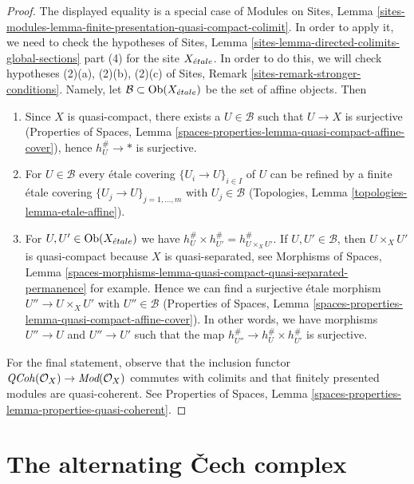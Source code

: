 \begin{proof}
The displayed equality is a special case of Modules on Sites, Lemma
\ref{sites-modules-lemma-finite-presentation-quasi-compact-colimit}.
In order to apply it, we need to check the hypotheses of
Sites, Lemma \ref{sites-lemma-directed-colimits-global-sections} part (4)
for the site $X_{\acute{e}tale}$.
In order to do this, we will check hypotheses
(2)(a), (2)(b), (2)(c) of
Sites, Remark \ref{sites-remark-stronger-conditions}.
Namely, let $\mathcal{B} \subset \mathop{\mathrm{Ob}}\nolimits(X_{\acute{e}tale})$ be the set of affine objects.
Then
\begin{enumerate}
\item Since $X$ is quasi-compact, there exists a $U \in \mathcal{B}$
such that $U \to X$ is surjective
(Properties of Spaces, Lemma
\ref{spaces-properties-lemma-quasi-compact-affine-cover}),
hence $h_U^\# \to *$ is surjective.
\item For $U \in \mathcal{B}$ every \'etale covering $\{U_i \to U\}_{i \in I}$
of $U$ can be refined by a finite \'etale covering
$\{U_j \to U\}_{j = 1, \ldots, m}$ with $U_j \in \mathcal{B}$
(Topologies, Lemma \ref{topologies-lemma-etale-affine}).
\item For $U, U' \in \mathop{\mathrm{Ob}}\nolimits(X_{\acute{e}tale})$ we have
$h_U^\# \times h_{U'}^\# = h_{U \times_X U'}^\#$.
If $U, U' \in \mathcal{B}$, then $U \times_X U'$ is quasi-compact
because $X$ is quasi-separated, see Morphisms of Spaces, Lemma
\ref{spaces-morphisms-lemma-quasi-compact-quasi-separated-permanence}
for example. Hence we can find a surjective \'etale morphism
$U'' \to U \times_X U'$ with $U'' \in \mathcal{B}$
(Properties of Spaces, Lemma
\ref{spaces-properties-lemma-quasi-compact-affine-cover}).
In other words, we have morphisms $U'' \to U$ and $U'' \to U'$
such that the map $h_{U''}^\# \to h_U^\# \times h_{U'}^\#$ is
surjective.
\end{enumerate}
For the final statement, observe that the inclusion functor
$\mathit{QCoh}(\mathcal{O}_X) \to \textit{Mod}(\mathcal{O}_X)$
commutes with colimits and that finitely presented modules
are quasi-coherent. See
Properties of Spaces, Lemma
\ref{spaces-properties-lemma-properties-quasi-coherent}.
\end{proof}





\section{The alternating {\v C}ech complex}
\label{section-alternating-cech}

